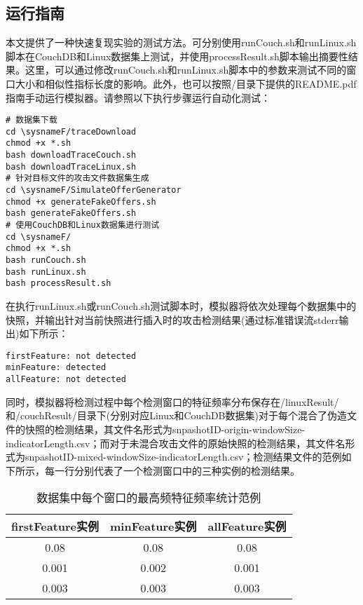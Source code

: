 \subsection*{运行指南}
本文提供了一种快速复现实验的测试方法。可分别使用runCouch.sh和runLinux.sh脚本在CouchDB和Linux数据集上测试\sysnameF，并使用processResult.sh脚本输出摘要性结果。这里，可以通过修改runCouch.sh和runLinux.sh脚本中的参数来测试不同的窗口大小和相似性指标长度的影响。此外，也可以按照\sysnameF/目录下提供的README.pdf指南手动运行模拟器。请参照以下执行步骤运行自动化测试：

\begin{lstlisting}[style=shell]
# 数据集下载
cd \sysnameF/traceDownload
chmod +x *.sh
bash downloadTraceCouch.sh
bash downloadTraceLinux.sh
# 针对目标文件的攻击文件数据集生成
cd \sysnameF/SimulateOfferGenerator
chmod +x generateFakeOffers.sh
bash generateFakeOffers.sh
# 使用CouchDB和Linux数据集进行测试
cd \sysnameF/
chmod +x *.sh
bash runCouch.sh
bash runLinux.sh
bash processResult.sh
\end{lstlisting}

在执行runLinux.sh或runCouch.sh测试脚本时，模拟器将依次处理每个数据集中的快照，并输出针对当前快照进行插入时的攻击检测结果(通过标准错误流stderr输出)如下所示：

\begin{lstlisting}[style=shell]
firstFeature: not detected
minFeature: detected
allFeature: not detected
\end{lstlisting}

同时，模拟器将检测过程中每个检测窗口的特征频率分布保存在\sysnameF/linuxResult/和\sysnameF/couchResult/目录下(分别对应Linux和CouchDB数据集)对于每个混合了伪造文件的快照的检测结果，其文件名形式为{snpashotID}-origin-{windowSize}-{indicatorLength}.csv；而对于未混合攻击文件的原始快照的检测结果，其文件名形式为{snpashotID}-mixed-{windowSize}-{indicatorLength}.csv；检测结果文件的范例如下所示，每一行分别代表了一个检测窗口中\sysnameF 的三种实例的检测结果。

\begin{table}[!htb]
    \small
    \centering
    \begin{tabular}{ccc}
        \toprule
        firstFeature实例 & minFeature实例 & allFeature实例 \\
        \midrule
        0.08             & 0.08           & 0.08           \\
        0.001            & 0.002          & 0.001          \\
        0.003            & 0.003          & 0.003          \\
        \bottomrule
    \end{tabular}
    \caption{数据集中每个窗口的最高频特征频率统计范例}
    \label{tab:system-detection-window}
\end{table}

